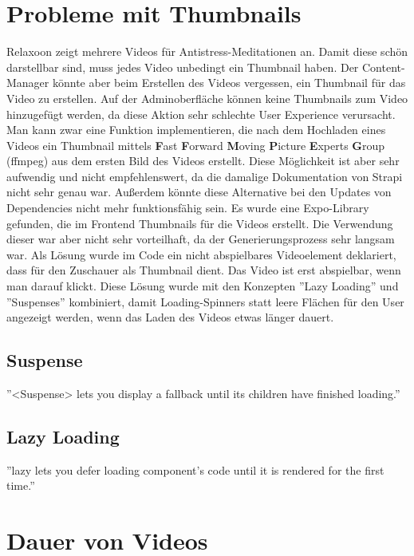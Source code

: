 \section{Probleme mit Thumbnails}\label{sec:probleme-mit-thumbnails}


Relaxoon zeigt mehrere Videos für Antistress-Meditationen an. Damit diese schön darstellbar sind,
muss jedes Video unbedingt ein Thumbnail haben.
Der Content-Manager könnte aber beim Erstellen des Videos vergessen,
ein Thumbnail für das Video zu erstellen.
Auf der Adminoberfläche können keine Thumbnails zum Video hinzugefügt werden,
da diese Aktion sehr schlechte User Experience verursacht.
Man kann zwar eine Funktion implementieren,
die nach dem Hochladen eines Videos ein Thumbnail mittels \textbf{F}ast \textbf{F}orward \textbf{M}oving
\textbf{P}icture \textbf{E}xperts \textbf{G}roup (ffmpeg) aus dem ersten Bild des Videos erstellt.
Diese Möglichkeit ist aber sehr aufwendig und nicht empfehlenswert, da die damalige Dokumentation von
Strapi nicht sehr genau war.
Außerdem könnte diese Alternative bei den Updates von Dependencies nicht mehr funktionsfähig sein.
Es wurde eine Expo-Library gefunden, die im Frontend Thumbnails für die Videos erstellt.
Die Verwendung dieser war aber nicht sehr vorteilhaft, da der Generierungsprozess sehr langsam war.
Als Lösung wurde im Code ein nicht abspielbares Videoelement deklariert,
dass für den Zuschauer als Thumbnail dient.
Das Video ist erst abspielbar, wenn man darauf klickt.
Diese Lösung wurde mit den Konzepten ''Lazy Loading'' und ''Suspenses'' kombiniert,
damit Loading-Spinners statt leere Flächen für den User angezeigt werden,
wenn das Laden des Videos etwas länger dauert.



\subsection{Suspense}\label{subsec:suspense}
''<Suspense> lets you display a fallback until its children have finished loading.''\cite{suspense}

\subsection{Lazy Loading}\label{subsec:lazy-loading}
''lazy lets you defer loading component’s code until it is rendered for
the first time.''\cite{lazyLoading}


\section{Dauer von Videos}\label{sec:dauer-von-videos}


